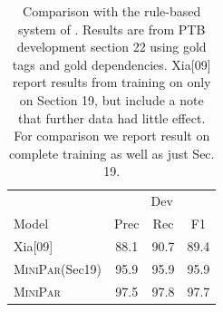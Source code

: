 \documentclass[11pt,letterpaper]{article}
\begin{document}
\begin{table}
  \centering
  \begin{tabular}{|l|ccc|}

    \hline
    & \multicolumn{3}{|c|}{Dev} \\
    Model & Prec & Rec & F1  \\
    \hline

    \hline
    Xia[09]  & 88.1 & 90.7 & 89.4 \\
    \textsc{MiniPar}(Sec19) & 95.9  & 95.9 & 95.9    \\
    \textsc{MiniPar}  & 97.5 &  97.8 & 97.7    \\
    \hline

  \end{tabular}
  \caption{Comparison with the rule-based system of .
    Results are from PTB development section 22 using gold tags and gold
    dependencies.
    Xia[09] report results from training on only on Section 19, but
    include a note that further data had little effect.
    For comparison we report result on complete training as well as just Sec. 19.
  }
  \label{tab:convert}
\end{table}






\end{document}
